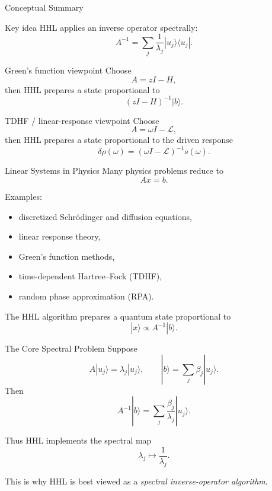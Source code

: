 \documentclass{beamer}
\begin{document}

\begin{frame}{Conceptual Summary}
  \begin{block}{Key idea}
    HHL applies an inverse operator spectrally:
    \[
    A^{-1} = \sum_j \frac{1}{\lambda_j}|u_j\rangle\langle u_j|.
    \]
  \end{block}

  \begin{block}{Green's function viewpoint}
    Choose
    \[
    A = zI - H,
    \]
    then HHL prepares a state proportional to
    \[
    (zI-H)^{-1}|b\rangle.
    \]
  \end{block}

  \begin{block}{TDHF / linear-response viewpoint}
    Choose
    \[
    A = \omega I - \mathcal{L},
    \]
    then HHL prepares a state proportional to the driven response
    \[
    \delta\rho(\omega) = (\omega I - \mathcal{L})^{-1} s(\omega).
    \]
  \end{block}
  \end{frame}




\begin{frame}{Linear Systems in Physics}
Many physics problems reduce to
\[
A x = b.
\]

Examples:
\begin{itemize}
\item discretized Schr\"odinger and diffusion equations,
\item linear response theory,
\item Green's function methods,
\item time-dependent Hartree--Fock (TDHF),
\item random phase approximation (RPA).
\end{itemize}

The HHL algorithm prepares a quantum state proportional to
\[
|x\rangle \propto A^{-1}|b\rangle.
\]
\end{frame}


\begin{frame}{The Core Spectral Problem}
Suppose
\[
A|u_j\rangle = \lambda_j |u_j\rangle,
\qquad
|b\rangle = \sum_j \beta_j |u_j\rangle.
\]
Then
\[
A^{-1}|b\rangle
=
\sum_j \frac{\beta_j}{\lambda_j}|u_j\rangle.
\]

Thus HHL implements the spectral map
\[
\lambda_j \mapsto \frac{1}{\lambda_j}.
\]

This is why HHL is best viewed as a \emph{spectral inverse-operator algorithm}.
\end{frame}
\end{document}
